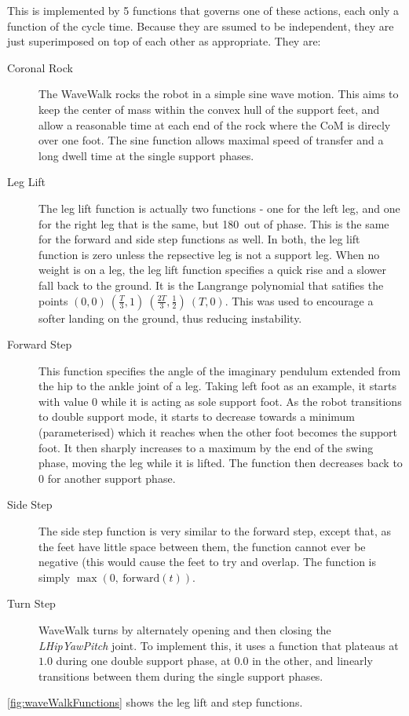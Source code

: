 \documentclass[pdftex,11pt,a4paper]{report}
\begin{document}
This is implemented by 5 functions that governs one of these actions, each
only a function of the cycle time. Because they are ssumed to be
independent, they are just superimposed on top of each other as appropriate. They are:
\begin{description}
    \item[Coronal Rock] The WaveWalk rocks the robot in a simple sine wave
        motion. This aims to keep the center of mass within the convex hull
        of the support feet, and allow a reasonable time at each end of the
        rock where the CoM is direcly over one foot. The sine function
        allows maximal speed of transfer and a long dwell time at the
        single support phases.
    \item[Leg Lift] The leg lift function is actually two functions - one
        for the left leg, and one for the right leg that is the same, but
        180\textdegree~out of phase. This is the same for the forward and
        side step functions as well. In both, the leg lift function is zero unless
        the repsective leg is not a support leg. When no weight is on a
        leg, the leg lift function specifies a quick rise and a slower fall
        back to the ground. It is the Langrange polynomial that satifies
        the points $(0, 0)\ (\frac{T}{3}, 1)\ (\frac{2T}{3}, \frac{1}{2})\ (T, 0) $.
        This was used to encourage a softer landing on the ground, thus
        reducing instability. 
    \item[Forward Step] This function specifies the angle of the imaginary
        pendulum extended from the hip to the ankle joint of a leg. Taking
        left foot as an example, it starts with value 0 while it is acting
        as sole support foot. As the robot transitions to double support
        mode, it starts to decrease towards a minimum (parameterised) which
        it reaches when the other foot becomes the support foot. It then
        sharply increases to a maximum by the end of the swing phase,
        moving the leg while it is lifted. The function then decreases back
        to 0 for another support phase.
    \item[Side Step] The side step function is very similar to the forward
        step, except that, as the feet have little space between them, the
        function cannot ever be negative (this would cause the feet to try
        and overlap. The function is simply $\max\left( 0,\
        \textrm{forward}(t) \right)$.
    \item[Turn Step] WaveWalk turns by alternately opening and then closing
        the \emph{LHipYawPitch} joint. To implement this, it uses a
        function that plateaus at $1.0$ during one double support phase, at
        $0.0$ in the other, and linearly transitions between them during
        the single support phases.
\end{description}
\autoref{fig:waveWalkFunctions} shows the leg lift and step functions.
\end{document}
